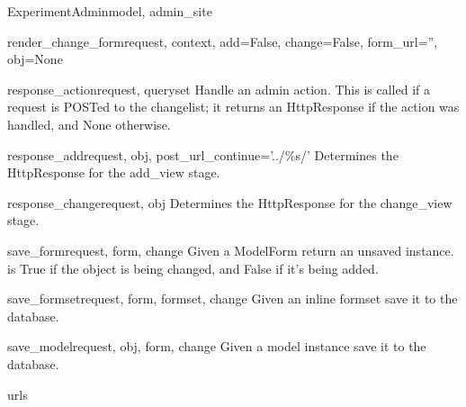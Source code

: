 \documentclass[letterpaper,10pt,english]{sphinxmanual}
\begin{document}
\begin{classdesc}{ExperimentAdmin}{model, admin\_site}
\hypertarget{data.admin.ExperimentAdmin.render_change_form}{}\begin{methoddesc}{render\_change\_form}{request, context, add=False, change=False, form\_url='', obj=None}\end{methoddesc}

\hypertarget{data.admin.ExperimentAdmin.response_action}{}\begin{methoddesc}{response\_action}{request, queryset}
Handle an admin action. This is called if a request is POSTed to the
changelist; it returns an HttpResponse if the action was handled, and
None otherwise.
\end{methoddesc}

\hypertarget{data.admin.ExperimentAdmin.response_add}{}\begin{methoddesc}{response\_add}{request, obj, post\_url\_continue='../\%s/'}
Determines the HttpResponse for the add\_view stage.
\end{methoddesc}

\hypertarget{data.admin.ExperimentAdmin.response_change}{}\begin{methoddesc}{response\_change}{request, obj}
Determines the HttpResponse for the change\_view stage.
\end{methoddesc}

\hypertarget{data.admin.ExperimentAdmin.save_form}{}\begin{methoddesc}{save\_form}{request, form, change}
Given a ModelForm return an unsaved instance.  is True if
the object is being changed, and False if it's being added.
\end{methoddesc}

\hypertarget{data.admin.ExperimentAdmin.save_formset}{}\begin{methoddesc}{save\_formset}{request, form, formset, change}
Given an inline formset save it to the database.
\end{methoddesc}

\hypertarget{data.admin.ExperimentAdmin.save_model}{}\begin{methoddesc}{save\_model}{request, obj, form, change}
Given a model instance save it to the database.
\end{methoddesc}

\hypertarget{data.admin.ExperimentAdmin.urls}{}\begin{memberdesc}{urls}\end{memberdesc}
\end{classdesc}
\end{document}
